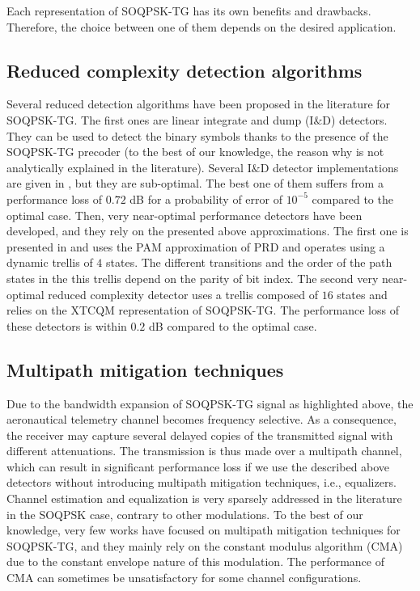 Each representation of SOQPSK-TG has its own benefits and drawbacks. Therefore, the choice between one of them depends on the desired application. 
    
\subsection*{Reduced complexity detection algorithms}
Several reduced detection algorithms have been proposed in the literature for SOQPSK-TG. The first ones are linear integrate and dump (I$\&$D) detectors. They can be used to detect the binary symbols thanks to the presence of the SOQPSK-TG precoder (to the best of our knowledge, the reason why is not analytically explained in the literature). Several I$\&$D detector implementations are given in \cite{soqpsk_opt_lin_det}, but they are sub-optimal. The best one of them suffers from a performance loss of $0.72$ dB for a probability of error of $10^{-5}$ compared to the optimal case. Then, very near-optimal performance detectors have been developed, and they rely on the presented above approximations. The first one is presented in \cite{demod_perrins} and uses the PAM approximation of PRD and operates using a dynamic trellis of $4$ states. The different transitions and the order of the path states in the this trellis depend on the parity of bit index. The second very near-optimal reduced complexity detector uses a trellis composed of $16$ states and relies on the XTCQM representation of SOQPSK-TG. The performance loss of these detectors is within $0.2$ dB compared to the optimal case.      
\subsection*{Multipath mitigation techniques}
Due to the bandwidth expansion of SOQPSK-TG signal as highlighted above, the aeronautical telemetry channel becomes frequency selective. As a consequence, the receiver may capture several delayed copies of the transmitted signal with different attenuations. The transmission is thus made over a multipath channel, which can result in significant performance loss if we use the described above detectors without introducing multipath mitigation techniques, i.e., equalizers. Channel estimation and equalization is very sparsely addressed in the literature in the SOQPSK case, contrary to other modulations. To the best of our knowledge, very few works \cite{buy_channel_taps2,CMA_soqpsk,CMA_soqpsk2} have focused on multipath mitigation techniques for SOQPSK-TG, and they mainly rely on the constant modulus algorithm (CMA) due to the constant envelope nature of this modulation. The performance of CMA can sometimes be unsatisfactory for some channel configurations. 
